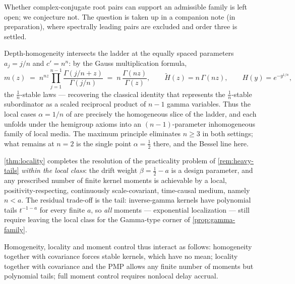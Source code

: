 \begin{remark}\label{rem:complex-roots}
Whether complex-conjugate root pairs can support an admissible family is left open; we
conjecture not. The question is taken up in a companion note (in preparation), where
spectrally leading pairs are excluded and order three is settled.
\end{remark}

\begin{remark}\label{rem:stable-slice}
Depth-homogeneity intersects the ladder at the equally spaced parameters $a_j = j/n$ and
$c' = n^n$: by the Gauss multiplication formula,
\[
  m(z) \;=\; n^{nz}\prod_{j=1}^{n-1}\frac{\Gamma(j/n + z)}{\Gamma(j/n)}
  \;=\; n\,\frac{\Gamma(nz)}{\Gamma(z)}, \qquad
  \tilde H(z) = n\,\Gamma(nz), \qquad H(y) = e^{-y^{1/n}},
\]
the $\tfrac1n$-stable laws --- recovering the classical identity that represents the
$\tfrac1n$-stable subordinator as a scaled reciprocal product of $n-1$ gamma variables. Thus
the local cases $\alpha = 1/n$ of  are precisely the
homogeneous slice of the ladder, and each unfolds under the hemigroup axioms into an
$(n-1)$-parameter inhomogeneous family of local media. The maximum principle eliminates
$n \ge 3$ in both settings; what remains at $n = 2$ is the single point $\alpha = \tfrac12$
there, and the Bessel line here.
\end{remark}

\begin{remark}\label{rem:trilemma}
\ref{thm:locality} completes the resolution of the practicality problem of
\ref{rem:heavy-tails} \emph{within the local class}: the drift weight $\beta = \tfrac12 - a$
is a design parameter, and any prescribed number of finite kernel moments is achievable by a
local, positivity-respecting, continuously scale-covariant, time-causal medium, namely
$n < a$. The residual trade-off is the tail: inverse-gamma kernels have polynomial tails
$t^{-1-a}$ for every finite $a$, so \emph{all} moments --- exponential localization --- still
require leaving the local class for the Gamma-type corner of \ref{prop:gamma-family}.

Homogeneity, locality and moment control thus interact as follows: homogeneity together with
covariance forces stable kernels, which have no mean; locality together with covariance and
the PMP allows any finite number of moments but polynomial tails; full moment control requires
nonlocal delay accrual.
\end{remark}

